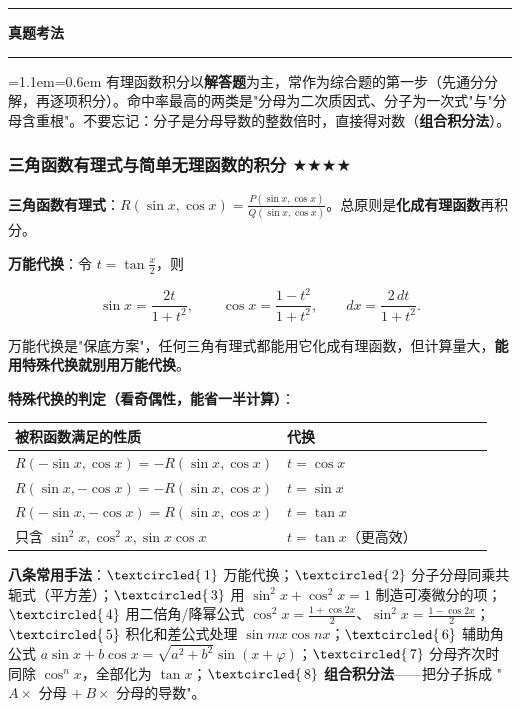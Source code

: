 \documentclass[11pt,openany,UTF8]{ctexbook}
\newcommand{\circled}[1]{\textcircled{\scriptsize\,#1}}
\newcommand{\callouthead}[2]{%
  \par\addvspace{7pt}\noindent
  {\color{#1}\rule[-0.15em]{3pt}{1.05em}}\hspace{0.5em}%
  {\bfseries\color{#1}#2}\par\nobreak\vspace{-0.35em}%
  {\color{rulesep}\hrule height 0.4pt}\nobreak\vspace{0.45em}%
  \begingroup\small\setlength{\parindent}{0pt}%
  \leftskip=1.1em\rightskip=0.6em\noindent\ignorespaces}
\newcommand{\calloutend}{\par\endgroup\addvspace{7pt}}
\newenvironment{callexam}[1]{\callouthead{exambar}{#1}}{\calloutend}
\begin{document}
\begin{callexam}{真题考法}
有理函数积分以\textbf{解答题}为主，常作为综合题的第一步（先通分分解，再逐项积分）。命中率最高的两类是"分母为二次质因式、分子为一次式"与"分母含重根"。不要忘记：分子是分母导数的整数倍时，直接得对数（\textbf{组合积分法}）。

\end{callexam}

\subsubsection{三角函数有理式与简单无理函数的积分 $\bigstar$$\bigstar$$\bigstar$$\bigstar$}

\textbf{三角函数有理式}：$R(\sin x,\cos x)=\frac{P(\sin x,\cos x)}{Q(\sin x,\cos x)}$。总原则是\textbf{化成有理函数}再积分。

\textbf{万能代换}：令 $t=\tan\frac{x}{2}$，则

\[\sin x=\frac{2t}{1+t^2},\qquad \cos x=\frac{1-t^2}{1+t^2},\qquad dx=\frac{2\,dt}{1+t^2}.\]

万能代换是"保底方案"，任何三角有理式都能用它化成有理函数，但计算量大，\textbf{能用特殊代换就别用万能代换}。

\textbf{特殊代换的判定（看奇偶性，能省一半计算）}：

\begingroup\small\setlength{\tabcolsep}{4.0pt}
\begin{longtable}{@{}L{0.4728\linewidth}L{0.4728\linewidth}@{}}
\toprule
\textbf{被积函数满足的性质} & \textbf{代换} \\
\midrule
\endhead
$R(-\sin x,\cos x)=-R(\sin x,\cos x)$ & $t=\cos x$ \\
$R(\sin x,-\cos x)=-R(\sin x,\cos x)$ & $t=\sin x$ \\
$R(-\sin x,-\cos x)=R(\sin x,\cos x)$ & $t=\tan x$ \\
只含 $\sin^2x,\cos^2x,\sin x\cos x$ & $t=\tan x$（更高效） \\
\bottomrule
\end{longtable}
\endgroup

\textbf{八条常用手法}：$\circled{1}$ 万能代换；$\circled{2}$ 分子分母同乘共轭式（平方差）；$\circled{3}$ 用 $\sin^2x+\cos^2x=1$ 制造可凑微分的项；$\circled{4}$ 用二倍角/降幂公式 $\cos^2x=\frac{1+\cos 2x}{2}$、$\sin^2x=\frac{1-\cos 2x}{2}$；$\circled{5}$ 积化和差公式处理 $\sin mx\cos nx$；$\circled{6}$ 辅助角公式 $a\sin x+b\cos x=\sqrt{a^2+b^2}\sin(x+\varphi)$；$\circled{7}$ 分母齐次时同除 $\cos^n x$，全部化为 $\tan x$；$\circled{8}$ \textbf{组合积分法}——把分子拆成 "$A\times$ 分母 $+\ B\times$ 分母的导数"。
\end{document}
